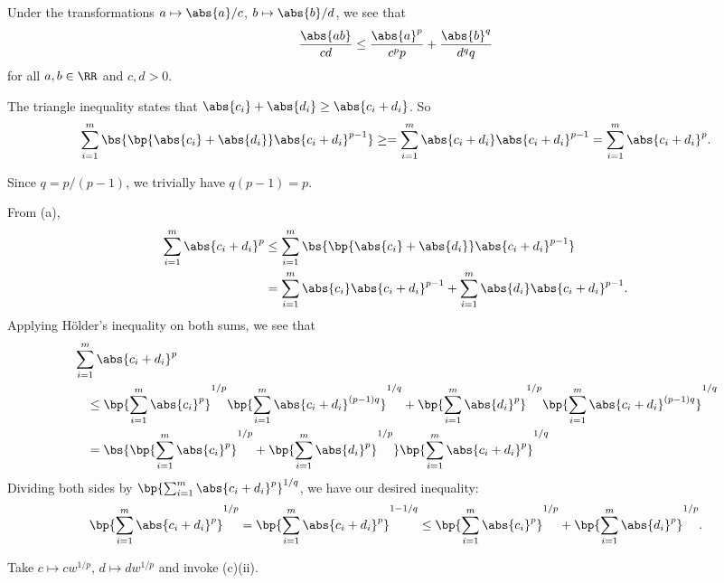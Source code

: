 \begin{solution}
\begin{ppart}
        Under the transformations $a \mapsto \abs{a}/c$, $b \mapsto \abs{b}/{d}$, we see that \[\frac{\abs{ab}}{cd} \leq \frac{\abs{a}^p}{c^p p} + \frac{\abs{b}^q}{d^q q}\] for all $a, b \in \RR$ and $c, d > 0$.
    \end{ppart}
    \begin{ppart}
        \begin{psubpart}
            The triangle inequality states that $\abs{c_i} + \abs{d_i} \geq \abs{c_i + d_i}$. So \[\sum_{i = 1}^m \bs{\bp{\abs{c_i} + \abs{d_i}} \abs{c_i + d_i}^{p-1}} \geq = \sum_{i = 1}^m \abs{c_i + d_i} \abs{c_i + d_i}^{p-1} = \sum_{i = 1}^m \abs{c_i + d_i}^p.\]
        \end{psubpart}
        \begin{psubpart}
            Since $q = p/(p-1)$, we trivially have $q(p-1) = p$.
        \end{psubpart}
        \begin{psubpart}
            From (a), 
            \begin{align*}
                \sum_{i = 1}^m \abs{c_i + d_i}^p &\leq \sum_{i = 1}^m \bs{\bp{\abs{c_i} + \abs{d_i}} \abs{c_i + d_i}^{p-1}}\\
                &= \sum_{i = 1}^m \abs{c_i} \abs{c_i + d_i}^{p-1} + \sum_{i = 1}^m \abs{d_i} \abs{c_i + d_i}^{p-1}.
            \end{align*}
            Applying H\"{o}lder's inequality on both sums, we see that
            \begin{align*}
                &\sum_{i = 1}^m \abs{c_i + d_i}^p\\
                &\hspace{1em}\leq \bp{\sum_{i = 1}^m \abs{c_i}^p}^{1/p} \bp{\sum_{i = 1}^m \abs{c_i + d_i}^{(p-1)q}}^{1/q} + \bp{\sum_{i = 1}^m \abs{d_i}^p}^{1/p} \bp{\sum_{i = 1}^m \abs{c_i + d_i}^{(p-1)q}}^{1/q}\\
                &\hspace{1em}= \bs{\bp{\sum_{i = 1}^m \abs{c_i}^p}^{1/p} + \bp{\sum_{i = 1}^m \abs{d_i}^p}^{1/p}}\bp{\sum_{i = 1}^m \abs{c_i + d_i}^{p}}^{1/q}
            \end{align*}
            Dividing both sides by $\bp{\sum_{i = 1}^m \abs{c_i + d_i}^{p}}^{1/q}$, we have our desired inequality: \[\bp{\sum_{i = 1}^m \abs{c_i + d_i}^p}^{1/p} = \bp{\sum_{i = 1}^m \abs{c_i + d_i}^p}^{1 - 1/q} \leq \bp{\sum_{i = 1}^m \abs{c_i}^p}^{1/p} + \bp{\sum_{i = 1}^m \abs{d_i}^p}^{1/p}.\]
        \end{psubpart}
        \begin{psubpart}
            Take $c \mapsto c w^{1/p}$, $d \mapsto d w^{1/p}$ and invoke (c)(ii).
        \end{psubpart}
    \end{ppart}
\end{solution}